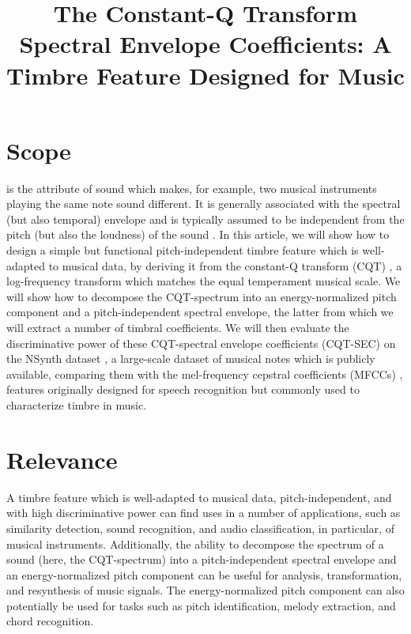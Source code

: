 \documentclass[journal]{IEEEtran}
\begin{document}
\title{The Constant-Q Transform Spectral Envelope Coefficients: A Timbre Feature Designed for Music}

\maketitle

\section{Scope}

 is the attribute of sound which makes, for example, two musical instruments playing the same note sound different. It is generally associated with the spectral (but also temporal) envelope and is typically assumed to be independent from the pitch (but also the loudness) of the sound \cite{moore2004}. In this article, we will show how to design a simple but functional pitch-independent timbre feature which is well-adapted to musical data, by deriving it from the constant-Q transform (CQT) \cite{brown1991, brown1992}, a log-frequency transform which matches the equal temperament musical scale. We will show how to decompose the CQT-spectrum into an energy-normalized pitch component and a pitch-independent spectral envelope, the latter from which we will extract a number of timbral coefficients. We will then evaluate the discriminative power of these CQT-spectral envelope coefficients (CQT-SEC) on the NSynth dataset \cite{engel2017}, a large-scale dataset of musical notes which is publicly available, comparing them with the mel-frequency cepstral coefficients (MFCCs) \cite{mermelstein1976}, features originally designed for speech recognition but commonly used to characterize timbre in music. 


\section{Relevance}

A timbre feature which is well-adapted to musical data, pitch-independent, and with high discriminative power can find uses in a number of applications, such as similarity detection, sound recognition, and audio classification, in particular, of musical instruments. Additionally, the ability to decompose the spectrum of a sound (here, the CQT-spectrum) into a pitch-independent spectral envelope and an energy-normalized pitch component can be useful for analysis, transformation, and resynthesis of music signals. The energy-normalized pitch component can also potentially be used for tasks such as pitch identification, melody extraction, and chord recognition.
\end{document}
